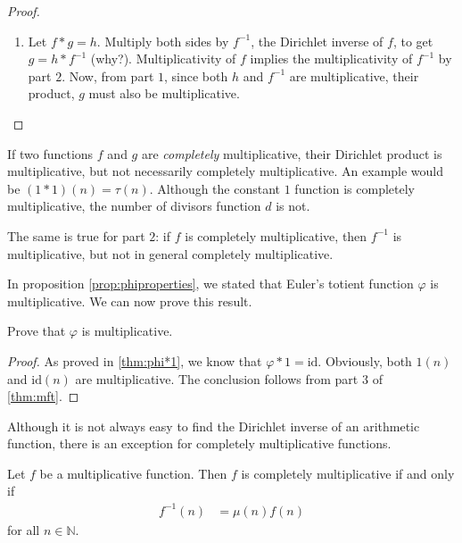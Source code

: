 \begin{proof}
\begin{enumerate}
			\item Let $f\ast g=h$. Multiply both sides by $f^{-1}$, the Dirichlet inverse of $f$, to get $g = h \ast f^{-1}$ (why?). Multiplicativity of $f$ implies the multiplicativity of $f^{-1}$ by part $2$. Now, from part $1$, since both $h$ and $f^{-1}$ are multiplicative, their product, $g$ must also be multiplicative.
		\end{enumerate}
	\end{proof}

	\begin{note}
		If two functions $f$ and $g$ are \textit{completely} multiplicative, their Dirichlet product is multiplicative, but not necessarily completely multiplicative. An example would be $(1 \ast 1)(n) = \tau(n)$. Although the constant $1$ function is completely multiplicative, the number of divisors function $d$ is not.

		The same is true for part $2$: if $f$ is completely multiplicative, then $f^{-1}$ is multiplicative, but not in general completely multiplicative.
	\end{note}

In proposition \ref{prop:phiproperties}, we stated that Euler's totient function $\varphi$ is multiplicative. We can now prove this result.

	\begin{proposition}\label{prop:multiplicativephi}
		Prove that $\varphi$ is multiplicative.
	\end{proposition}

	\begin{proof}
		As proved in \autoref{thm:phi*1}, we know that $\varphi \ast 1 = \text{id}$. Obviously, both $1(n)$ and $\text{id}(n)$ are multiplicative. The conclusion follows from part $3$ of \autoref{thm:mft}.
	\end{proof}


Although it is not always easy to find the Dirichlet inverse of an arithmetic function, there is an exception for completely multiplicative functions.

	\begin{theorem}\label{thm:completelymultiplicative}
		Let $f$ be a multiplicative function. Then $f$ is completely multiplicative if and only if
			\begin{align*}
				f^{-1}(n)
					& = \mu(n) f(n)
			\end{align*}
		for all $n\in\mathbb{N}$.
	\end{theorem}

